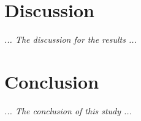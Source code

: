 \section{Discussion}
\textit{... The discussion for the results ...}

\section{Conclusion}
\textit{... The conclusion of this study ...}
